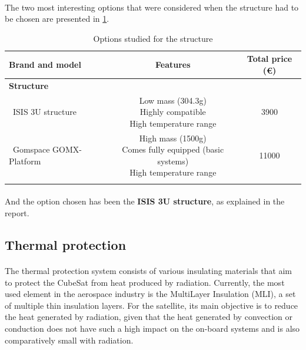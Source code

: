 \paragraph{}The two most interesting options that were considered when the structure had to be chosen are presented in \ref{structureoptions}.

\begin{longtable}{| l | c | c | }
\hline
\rowcolor[gray]{0.80}	\textbf{Brand and model} &  \textbf{Features}     & \textbf{Total price (\euro)}   \\
\hline
\endfirsthead

\rowcolor[gray]{0.85} \textbf{Structure} &  &  \\
	   ~ISIS 3U structure & \makecell{Low mass (304.3g) \\ Highly compatible \\ High temperature range} & 3900 \\
	   \hline
	   ~Gomspace GOMX-Platform & \makecell{High mass (1500g) \\ Comes fully equipped (basic systems) \\ High temperature range} & 11000 \\
	   \hline
\caption{Options studied for the structure}
\label{structureoptions}
\end{longtable}

\paragraph{}And the option chosen has been the \textbf{ISIS 3U structure}, as explained in the report.

\subsection{Thermal protection}
\paragraph{}The thermal protection system consists of various insulating materials that aim to protect the CubeSat from heat produced by radiation. Currently, the most used element in the aerospace industry is the MultiLayer Insulation (MLI), a set of multiple thin insulation layers. For the satellite, its main objective is to reduce the heat generated by radiation, given that the heat generated by convection or conduction does not have such a high impact on the on-board systems and is also comparatively small with radiation. 

